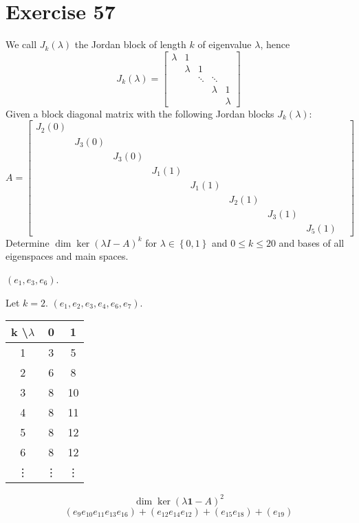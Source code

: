 \documentclass[a4paper]{article}
\theoremstyle{definition}
\newcommand\set[1]{\left\{#1\right\}}
\begin{document}
\section*{Exercise 57}
\begin{ex}
  We call $J_k(\lambda)$ the Jordan block of length $k$ of eigenvalue $\lambda$, hence
  \[ J_k(\lambda) = \begin{bmatrix} \lambda & 1 & & & \\ & \lambda & 1 & & \\ & & \ddots & \ddots & \\ & & & \lambda & 1 \\ & & & & \lambda \end{bmatrix} \]
  Given a block diagonal matrix with the following Jordan blocks $J_k(\lambda)$:
  \[
    A = \begin{bmatrix}
      J_2(0) & & & & & & & & \\
      & J_3(0) & & & & & & & \\
      & & J_3(0) & & & & & & \\
      & & & J_1(1) & & & & & \\
      & & & & J_1(1) & & & & \\
      & & & & & J_2(1) & & & \\
      & & & & & & J_3(1) & & \\
      & & & & & & & J_5(1) &
    \end{bmatrix}
  \]
  Determine $\dim\ker(\lambda I - A)^k$ for $\lambda \in \set{0,1}$ and $0 \leq k \leq 20$ and bases of all eigenspaces and main spaces.
\end{ex}

$(e_1, e_3, e_6)$.

Let $k = 2$. $(e_1, e_2, e_3, e_4, e_6, e_7)$.

\begin{tabular}{ccc}
  k \textbackslash $\lambda$ & 0 & 1 \\
\hline
  1 & 3 & 5 \\
  2 & 6 & 8 \\
  3 & 8 & 10 \\
  4 & 8 & 11 \\
  5 & 8 & 12 \\
  6 & 8 & 12 \\
  \vdots & \vdots & \vdots
\end{tabular}

\[ \dim\ker(\lambda \mathbf 1 - A)^2 \]
\[ (e_9 e_{10} e_{11} e_{13} e_{16}) + (e_{12} e_{14} e_{12}) + (e_{15} e_{18}) + (e_{19}) \]
\end{document}
